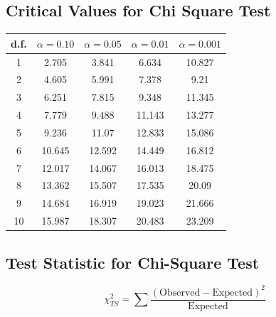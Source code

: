 \documentclass[a4paper,12pt]{article}
\begin{document}
\subsection*{Critical Values for Chi Square Test}
{
	\Large
	\begin{center}
		\begin{tabular}{|c|c|c|c|c|}
			\hline 
			d.f.	&	$\alpha=0.10$	&	$\alpha=0.05$	&	$\alpha=0.01$	&	$\alpha=0.001$	\\ \hline
			1	& 	2.705	&	3.841	&	6.634	&	10.827	\\ \hline
			2	&	4.605	&	5.991	&	7.378	&	9.21	\\ \hline
			3	&	6.251	&	7.815	&	9.348	&	11.345	\\ \hline
			4	&	7.779	&	9.488	&	11.143	&	13.277	\\ \hline
			5	&	9.236	&	11.07	&	12.833	&	15.086	\\ \hline
			6	&	10.645	&	12.592	&	14.449	&	16.812	\\ \hline
			7	&	12.017	&	14.067	&	16.013	&	18.475	\\ \hline
			8	&	13.362	&	15.507	&	17.535	&	20.09	\\ \hline
			9	&	14.684	&	16.919	&	19.023	&	21.666	\\ \hline
			10	&	15.987	&	18.307	&	20.483	&	23.209	\\ \hline
		\end{tabular} 
	\end{center}
}
\bigskip
\subsection*{Test Statistic for Chi-Square Test}
{
\Large
\[ \chi^2_{TS} = \sum \frac{(\mbox{Observed} -\mbox{Expected} )^2}{\mbox{Expected} }\]
}
\end{document}
